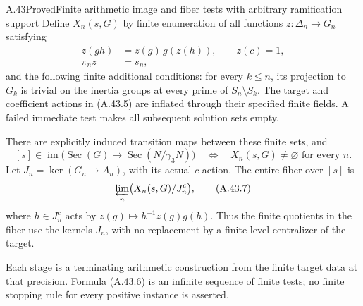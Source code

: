 \begin{statement}{A.43}{Proved}{Finite arithmetic image and fiber tests with arbitrary ramification support}
Define $X_n(s,G)$ by finite enumeration of all functions
$z:\Delta_n\to G_n$ satisfying
\[
\begin{split}
 z(gh)&=z(g)\,g(z(h)),\qquad z(c)=1,\\
 \pi_n z&=s_n,
\end{split}
 \tag{A.43.5}
\]
and the following finite additional conditions: for every
$k\le n$, its projection to $G_k$ is trivial on the inertia
groups at every prime of $S_n\setminus S_k$. The target and
coefficient actions in (A.43.5) are inflated through their
specified finite fields. A failed immediate test makes all
subsequent solution sets empty.

There are explicitly induced transition maps between these
finite sets, and
\[
 [s]\in\operatorname{im}
    \bigl(\operatorname{Sec}(G)\to\operatorname{Sec}(N/\gamma_3N)\bigr)
       \quad\Longleftrightarrow\quad
                 X_n(s,G)\ne\varnothing\text{ for every }n.
 \tag{A.43.6}
\]
Let $J_n=\ker(G_n\to A_n)$, with its actual $c$-action.
The entire fiber over $[s]$ is
\[
                      \varprojlim_n\bigl(X_n(s,G)/J_n^c\bigr),
 \tag{A.43.7}
\]
where $h\in J_n^c$ acts by
$z(g)\mapsto h^{-1}z(g)g(h)$. Thus the finite quotients in
the fiber use the kernels $J_n$, with no replacement by a
finite-level centralizer of the target.

Each stage is a terminating arithmetic construction from
the finite target data at that precision. Formula (A.43.6)
is an infinite sequence of finite tests; no finite stopping
rule for every positive instance is asserted.
\end{statement}
